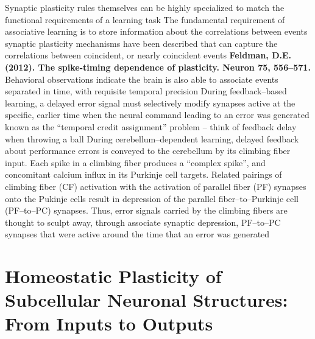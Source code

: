 \documentclass[11pt, a4paper, oneside]{article}   	%
\begin{document}
\begin{outline}
    \point Synaptic plasticity rules themselves can be highly specialized to match the functional requirements of a learning task
    \point The fundamental requirement of associative learning is to store information about the correlations between events
        \subpoint synaptic plasticity mechanisms have been described that can capture the correlations between coincident, or nearly coincident events
           \subsubpoint \textbf{Feldman, D.E. (2012). The spike-timing dependence of plasticity. Neuron 75, 556–571.}
        \subpoint Behavioral observations indicate the brain is also able to associate events separated in time, with requisite temporal precision
            \subsubpoint During feedback--based learning, a delayed error signal must selectively modify synapses active at the specific, earlier time when the neural command leading to an error was generated
            \supersubpoint known as the ``temporal credit assignment'' problem -- think of feedback delay when throwing a ball
    \point During cerebellum--dependent learning, delayed feedback about performance errors is conveyed to the cerebellum by its climbing fiber input.
        \subpoint Each spike in a climbing fiber produces a ``complex spike'', and concomitant calcium influx in its Purkinje cell targets. Related pairings of climbing fiber (CF) activation with the activation of parallel fiber (PF) synapses onto the Pukinje cells result in depression of the parallel fiber--to--Purkinje cell (PF--to--PC) synapses.
            \subsubpoint Thus, error signals carried by the climbing fibers are thought to sculpt away, through associate synaptic depression, PF--to--PC synapses that were active around the time that an error was generated

    
\end{outline}








\section{Homeostatic Plasticity of Subcellular Neuronal Structures: From Inputs to Outputs \cite{Wefelmeyer2016}}
\end{document}
